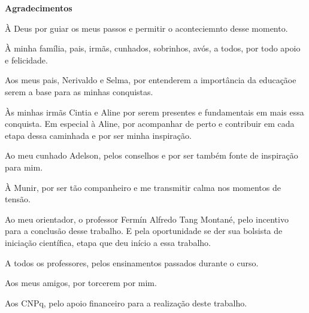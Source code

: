 \begin{center}
\textbf{\Large Agradecimentos} \\ [2.5cm]
\end{center}

À Deus por guiar os meus passos e permitir o aconteciemnto desse momento.

\noindent
À minha família, pais, irmãs, cunhados, sobrinhos, avós, a todos, por todo apoio e felicidade. 

\noindent
Aos meus pais, Nerivaldo e Selma, por entenderem a importância da educaçãoe serem a base para as minhas conquistas. 

\noindent
Às minhas irmãs Cintia e Aline por serem presentes e fundamentais em mais essa conquista. Em especial à Aline, por acompanhar de perto e contribuir em cada etapa dessa caminhada e por ser minha inspiração.

\noindent
Ao meu cunhado Adelson, pelos conselhos e por ser também fonte de inspiração para mim.

\noindent
À Munir, por ser tão companheiro e me transmitir calma nos momentos de tensão. 

\noindent
Ao meu orientador, o professor Fermín Alfredo Tang Montané, pelo incentivo para a conclusão desse trabalho. E pela oportunidade se der sua bolsista de iniciação científica, etapa que deu início a essa trabalho.

\noindent
A todos os professores, pelos ensinamentos passados durante o curso. 

\noindent
Aos meus amigos, por torcerem por mim.

\noindent
Aos CNPq, pelo apoio financeiro para a realização deste trabalho.
